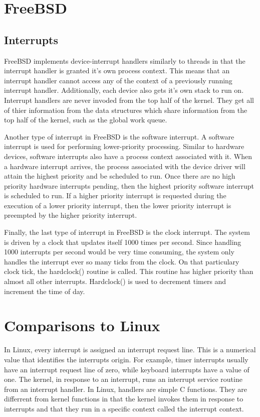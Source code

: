 \documentclass[journal,letterpaper,draftclsnofoot,onecolumn,10pt]{IEEEtran}
\begin{document}
\section{FreeBSD}

\subsection{Interrupts}
FreeBSD implements device-interrupt handlers similarly to threads in that the interrupt handler is granted it's own process context. This means that an interrupt handler cannot access any of the context of a previously running interrupt handler. Additionally, each device also gets it's own stack to run on. Interrupt handlers are never invoded from the top half of the kernel. They get all of thier information from the data structures which share information from the top half of the kernel, such as the global work queue.\cite{mn15}

Another type of interrupt in FreeBSD is the software interrupt. A software interrupt is used for performing lower-priority processing. Similar to hardware devices, software interrupts also have a process context associated with it. When a hardware interrupt arrives, the process associated with the device driver will attain the highest priority and be scheduled to run. Once there are no high priority hardware interrupts pending, then the highest priority software interrupt is scheduled to run. If a higher priority interrupt is requested during the execution of a lower priority interrupt, then the lower priority interrupt is preempted by the higher priority interrupt.\cite{mn15}

Finally, the last type of interrupt in FreeBSD is the clock interrupt. The system is driven by a clock that updates itself 1000 times per second. Since handling 1000 interrupts per second would be very time consuming, the system only handles the interrupt ever so many ticks from the clock. On that particulary clock tick, the hardclock() routine is called. This routine has higher priority than almost all other interrupts. Hardclock() is used to decrement timers and increment the time of day.\cite{mn15}

\section{Comparisons to Linux}

In Linux, every interrupt is assigned an interrupt request line. This is a numerical value that identifies the interrupts origin. For example, timer interrupts usually have an interrupt request line of zero, while keyboard interrupts have a value of one. The kernel, in response to an interrupt, runs an interrupt service routine from an interrupt handler. In Linux, handlers are simple C functions. They are differrent from kernel functions in that the kernel invokes them in response to interrupts and that they run in a specific context called the interrupt context.\cite{l05}
\end{document}
